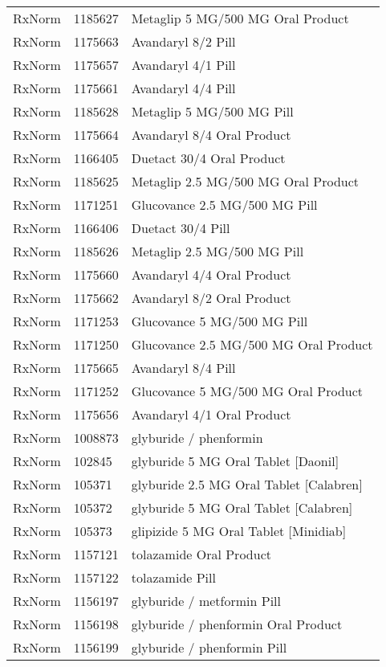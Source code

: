 \begin{longtable}{p{}p{}p{}}
  RxNorm & 1185627 & Metaglip 5 MG/500 MG Oral Product \\ 
  RxNorm & 1175663 & Avandaryl 8/2 Pill \\ 
  RxNorm & 1175657 & Avandaryl 4/1 Pill \\ 
  RxNorm & 1175661 & Avandaryl 4/4 Pill \\ 
  RxNorm & 1185628 & Metaglip 5 MG/500 MG Pill \\ 
  RxNorm & 1175664 & Avandaryl 8/4 Oral Product \\ 
  RxNorm & 1166405 & Duetact 30/4 Oral Product \\ 
  RxNorm & 1185625 & Metaglip 2.5 MG/500 MG Oral Product \\ 
  RxNorm & 1171251 & Glucovance 2.5 MG/500 MG Pill \\ 
  RxNorm & 1166406 & Duetact 30/4 Pill \\ 
  RxNorm & 1185626 & Metaglip 2.5 MG/500 MG Pill \\ 
  RxNorm & 1175660 & Avandaryl 4/4 Oral Product \\ 
  RxNorm & 1175662 & Avandaryl 8/2 Oral Product \\ 
  RxNorm & 1171253 & Glucovance 5 MG/500 MG Pill \\ 
  RxNorm & 1171250 & Glucovance 2.5 MG/500 MG Oral Product \\ 
  RxNorm & 1175665 & Avandaryl 8/4 Pill \\ 
  RxNorm & 1171252 & Glucovance 5 MG/500 MG Oral Product \\ 
  RxNorm & 1175656 & Avandaryl 4/1 Oral Product \\ 
  RxNorm & 1008873 & glyburide / phenformin \\ 
  RxNorm & 102845 & glyburide 5 MG Oral Tablet [Daonil] \\ 
  RxNorm & 105371 & glyburide 2.5 MG Oral Tablet [Calabren] \\ 
  RxNorm & 105372 & glyburide 5 MG Oral Tablet [Calabren] \\ 
  RxNorm & 105373 & glipizide 5 MG Oral Tablet [Minidiab] \\ 
  RxNorm & 1157121 & tolazamide Oral Product \\ 
  RxNorm & 1157122 & tolazamide Pill \\ 
  RxNorm & 1156197 & glyburide / metformin Pill \\ 
  RxNorm & 1156198 & glyburide / phenformin Oral Product \\ 
  RxNorm & 1156199 & glyburide / phenformin Pill \\ 

\end{longtable}
